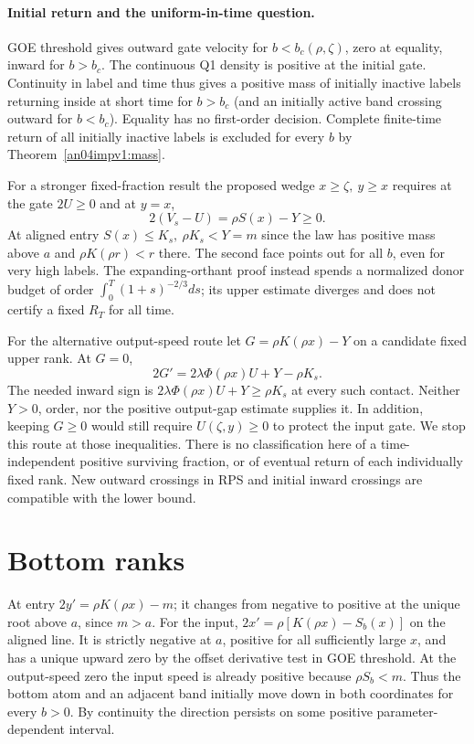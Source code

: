 \documentclass[11pt]{article}
\begin{document}
\paragraph{Initial return and the uniform-in-time question.}
GOE threshold gives outward gate velocity for \(b<b_c(\rho,\zeta)\),
zero at equality, inward for \(b>b_c\). The continuous Q1 density is
positive at the initial gate. Continuity in label and time thus gives
a positive mass of initially inactive labels returning inside at short
time for \(b>b_c\) (and an initially active band crossing outward
for \(b<b_c\)). Equality has no first-order decision. Complete
finite-time return of all initially inactive labels is excluded for
every \(b\) by Theorem~\ref{an04impv1:mass}.

For a stronger fixed-fraction result the proposed wedge \(x\ge\zeta,\
y\ge x\) requires at the gate \(2U\ge0\) and at \(y=x\),
\[
 2(V_s-U)=\rho S(x)-Y\ge0 .
\]
At aligned entry \(S(x)\le K_s,\ \rho K_s<Y=m\) since the law
has positive mass above \(a\) and \(\rho K(\rho r)<r\) there. The
second face points out for all \(b\), even for very high labels.
The expanding-orthant proof instead spends a normalized donor budget
of order \(\int_0^T(1+s)^{-2/3}ds\); its upper estimate diverges
and does not certify a fixed \(R_T\) for all time.

For the alternative output-speed route let \(G=\rho K(\rho x)-Y\)
on a candidate fixed upper rank. At \(G=0\),
\[
 2G'=2\lambda\Phi(\rho x)U+Y-\rho K_s .
\]
The needed inward sign is \(2\lambda\Phi(\rho x)U+Y\ge\rho K_s\)
at every such contact. Neither \(Y>0\), order, nor the positive
output-gap estimate supplies it. In addition, keeping \(G\ge0\)
would still require \(U(\zeta,y)\ge0\) to protect the input gate.
We stop this route at those inequalities. There is no classification
here of a time-independent positive surviving fraction, or of eventual
return of each individually fixed rank. New outward crossings in RPS
and initial inward crossings are compatible with the lower bound.

\section{Bottom ranks}\label{an04impv1:bottom}
At entry \(2y'=\rho K(\rho x)-m\); it changes from negative to
positive at the unique root above \(a\), since \(m>a\).
For the input, \(2x'=\rho[K(\rho x)-S_b(x)]\) on the aligned line.
It is strictly negative at \(a\), positive for all sufficiently
large \(x\), and has a unique upward zero by the offset derivative
test in GOE threshold. At the output-speed zero the input speed is
already positive because \(\rho S_b< m\). Thus the bottom atom and
an adjacent band initially move down in both coordinates for every
\(b>0\). By continuity the direction persists on some positive
parameter-dependent interval.
\end{document}
